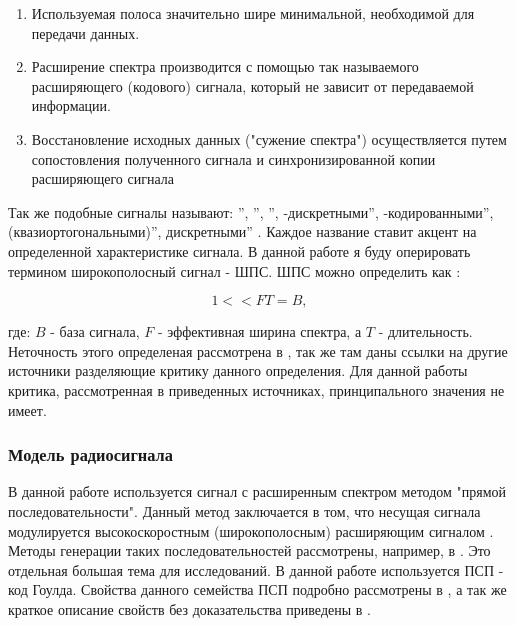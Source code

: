 \begin{enumerate}
	\item Используемая полоса значительно шире минимальной, необходимой для передачи данных.
	\item Расширение спектра производится с помощью так называемого расширяющего (кодового) сигнала,
		который не зависит от передаваемой информации.
	\item Восстановление исходных данных ("сужение спектра") осуществляется путем сопостовления полученного
		сигнала и синхронизированной копии расширяющего сигнала
\end{enumerate}
Так же подобные сигналы называют:
\textquotedblright,
\textquotedblright,
\textquotedblright,
-дискретными\textquotedblright,
-кодированными\textquotedblright,
 (квазиортогональными)\textquotedblright,
 дискретными\textquotedblright
\cite{gantmaher-book}.
Каждое название ставит акцент на определенной характеристике сигнала. В данной работе я буду оперировать термином
широкополосный сигнал - ШПС. ШПС можно определить как \cite{gantmaher-book, varakin-book}:

\begin{center}
\begin{equation}
	\label{eq:ss_signal}
	1 << FT = B,
\end{equation}
\end{center}
где: ${B}$ - база сигнала, ${F}$ - эффективная ширина спектра, а ${T}$ - длительность.
Неточность этого определеная рассмотрена в \cite{gantmaher-book}, так же там даны ссылки на другие источники
разделяющие критику данного определения. Для данной работы критика, рассмотренная в приведенных источниках,
принципального значения не имеет.

\subsubsection{Модель радиосигнала}
В данной работе используется сигнал с расширенным спектром методом "прямой последовательности". Данный метод
заключается в том, что несущая сигнала модулируется высокоскоростным (широкополосным) расширяющим сигналом \cite{sklyar}.
Методы генерации таких последовательностей рассмотрены, например, в \cite{gantmaher-book, pestryakov-book}. Это отдельная большая
тема для исследований. В данной работе используется ПСП - код Гоулда. Свойства данного семейства ПСП подробно рассмотрены в
\cite{gold-ieee}, а так же краткое описание свойств без доказательства приведены в \cite{tsui, akos-book}.

